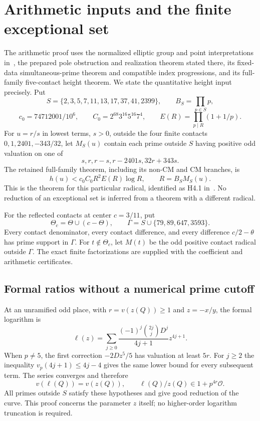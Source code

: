 \documentclass[11pt,a4paper]{article}
\begin{document}
\section{Arithmetic inputs and the finite exceptional set}

The arithmetic proof uses the normalized elliptic group and point
interpretations in~\cite{ExplicitParent}, the prepared pole obstruction
and realization theorem stated there, its fixed-data simultaneous-prime
theorem and compatible index progressions, and its full-family
five-contact height theorem. We state the quantitative height input
precisely. Put
\[
 S=\{2,3,5,7,11,13,17,37,41,2399\},\qquad B_S=\prod_{p\in S}p,
\]
\[
 c_0=74712001/10^6,\qquad C_0=2^{68}3^{16}5^{16}7^4,
 \qquad E(R)=\prod_{p\mid R}(1+1/p).
\]
For $u=r/s$ in lowest terms, $s>0$, outside the four finite contacts
$0,1,2401,-343/32$, let $M_S(u)$ contain each prime outside $S$
having positive odd valuation on one of
\[
                       s,r,r-s,r-2401s,32r+343s.
\]
The retained full-family theorem, including its non-CM and CM branches,
is
\begin{equation}\label{eq:height-input}
 h(u)<c_0C_0 R^2E(R)\log R,\qquad R=B_SM_S(u).
\end{equation}
This is the theorem for this particular radical, identified as H4.1
in~\cite{ExplicitParent}. No reduction of an exceptional set is
inferred from a theorem with a different radical.

For the reflected contacts at center $c=3/11$, put
\[
 \Theta_c=\Theta\cup(c-\Theta),\qquad
 \Gamma=S\cup\{79,89,647,3593\}.
\]
Every contact denominator, every contact difference, and every
difference $c/2-\theta$ has prime support in $\Gamma$.
For $t\notin\Theta_c$, let $M(t)$ be the odd positive contact radical
outside $\Gamma$. The exact finite factorizations are supplied with
the coefficient and arithmetic certificates.

\subsection{Formal ratios without a numerical prime cutoff}

At an unramified odd place, with $r=v(z(Q))\ge1$ and $z=-x/y$,
the formal logarithm is
\[
 \ell(z)=\sum_{j\ge0}
 \frac{(-1)^j\binom{2j}{j}D^j}{4j+1}z^{4j+1}.
\]
When $p\ne5$, the first correction $-2Dz^5/5$ has valuation
at least $5r$. For $j\ge2$ the inequality
$v_p(4j+1)\le4j-4$ gives the same lower bound for every
subsequent term. The series converges and therefore
\begin{equation}\label{eq:local-log}
 v(\ell(Q))=v(z(Q)),\qquad
                  \ell(Q)/z(Q)\in1+p^{4r}\mathcal O.
\end{equation}
All primes outside $S$ satisfy these hypotheses and give good
reduction of the curve. This proof concerns the parameter $z$
itself; no higher-order logarithm truncation is required.
\end{document}
